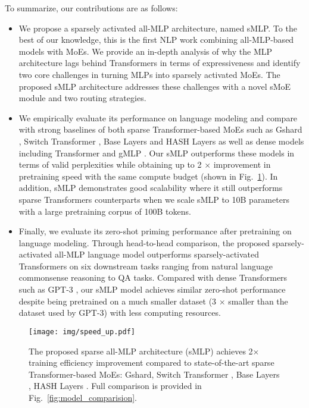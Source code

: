 \documentclass{article}
\begin{document}
To summarize, our contributions are as follows:
\begin{itemize}
\item We propose a sparsely activated all-MLP architecture, named sMLP. To the best of our knowledge, this is the first NLP work combining all-MLP-based models with MoEs. We provide an in-depth analysis of why the MLP architecture lags behind Transformers in terms of expressiveness and identify two core challenges in turning MLPs into sparsely activated MoEs. The proposed sMLP architecture addresses these challenges with a novel sMoE module and two routing strategies. 
\item We empirically evaluate its performance on language modeling and compare with strong baselines of both sparse Transformer-based MoEs such as Gshard \citep{gshard}, Switch Transformer \citep{switch}, Base Layers \citep{baselayer} and HASH Layers \citep{hashlayer} as well as dense models including Transformer \citep{vaswani2017attention} and gMLP \citep{gmlp}. Our sMLP outperforms these models in terms of valid perplexities while obtaining up to 2 $\times$ improvement in pretraining speed with the same compute budget (shown in Fig.~\ref{fig:speed_up}). In addition, sMLP demonstrates good scalability where it still outperforms sparse Transformers counterparts when we scale sMLP to 10B parameters with a large pretraining corpus of 100B tokens.
\item Finally, we evaluate its zero-shot priming performance after pretraining on language modeling. Through head-to-head comparison, the proposed sparsely-activated all-MLP language model outperforms sparsely-activated Transformers on six downstream tasks ranging from natural language commonsense reasoning to QA tasks.
    Compared with dense Transformers such as GPT-3 \citep{gpt3}, our sMLP model achieves similar zero-shot performance despite being pretrained on a much smaller dataset (3 $\times$ smaller than the dataset used by GPT-3) with less computing resources.
\end{itemize}








\begin{figure}
    \centering
    \texttt{[image: img/speed\_up.pdf]}
    \vspace{-6mm}
    \caption{The proposed sparse all-MLP architecture (sMLP) achieves 2$\times$ training efficiency improvement compared to state-of-the-art sparse Transformer-based MoEs: Gshard\citep{gshard}, Switch Transformer \citep{switch}, Base Layers \citep{baselayer}, HASH Layers \citep{hashlayer}. Full comparison is provided in Fig.~\ref{fig:model_comparision}.} 
\label{fig:speed_up}
\end{figure}
\end{document}
